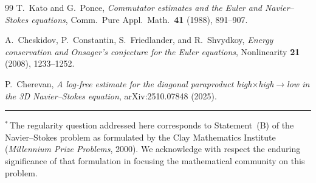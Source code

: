 \documentclass[11pt]{article}
\begin{document}
\begin{thebibliography}{99}
T.~Kato and G.~Ponce,
\textit{Commutator estimates and the Euler and Navier--Stokes equations},
Comm.\ Pure Appl.\ Math.\ \textbf{41} (1988), 891--907.

A.~Cheskidov, P.~Constantin, S.~Friedlander, and R.~Shvydkoy,
\textit{Energy conservation and Onsager's conjecture for the Euler equations},
Nonlinearity \textbf{21} (2008), 1233--1252.

P.~Cherevan,
\textit{A log-free estimate for the diagonal paraproduct
high$\times$high$\to$low in the 3D Navier--Stokes equation},
arXiv:2510.07848 (2025).


\bigskip
\noindent\rule{\textwidth}{0.4pt}

\noindent\footnotesize{$^*$\,The regularity question addressed here
corresponds to Statement~(B) of the Navier--Stokes problem
as formulated by the Clay Mathematics Institute
(\textit{Millennium Prize Problems}, 2000).
We acknowledge with respect the enduring significance of that
formulation in focusing the mathematical community on this problem.}

\end{thebibliography}
\end{document}

